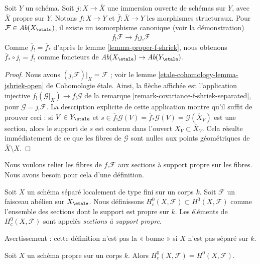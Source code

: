 \begin{lemma}
\label{lemma-compactify-f-shriek-separated}
Soit $Y$ un schéma. Soit $j : X \to \overline{X}$ une immersion
ouverte de schémas sur $Y$, avec $\overline{X}$ propre sur $Y$.
Notons $f : X \to Y$ et $\overline{f} : \overline{X} \to Y$
les morphismes structuraux. Pour $\mathcal{F} \in \textit{Ab}(X_\etale)$,
il existe un isomorphisme canonique (voir la démonstration)
$$
f_!\mathcal{F} \longrightarrow \overline{f}_!j_!\mathcal{F}
$$
Comme $\overline{f}_! = \overline{f}_*$ d'après le
lemme \ref{lemma-proper-f-shriek}, nous obtenons
$\overline{f}_* \circ j_! = f_!$ comme foncteurs de
$\textit{Ab}(X_\etale) \to \textit{Ab}(Y_\etale)$.
\end{lemma}

\begin{proof}
Nous avons $(j_!\mathcal{F})|_X = \mathcal{F}$ ; voir le
lemme \ref{etale-cohomology-lemma-jshriek-open} de Cohomologie étale.
Ainsi, la flèche affichée est l'application injective
$f_!(\mathcal{G}|_X) \to \overline{f}_!\mathcal{G}$
de la remarque \ref{remark-covariance-f-shriek-separated},
pour $\mathcal{G} = j_!\mathcal{F}$. La description explicite
de cette application montre qu'il suffit de prouver ceci : si $V \in Y_\etale$ et
$s \in \overline{f}_!\mathcal{G}(V) = \overline{f}_*\mathcal{G}(V) =
\mathcal{G}(\overline{X}_V)$
est une section, alors le support de $s$ est contenu dans l'ouvert
$X_V \subset \overline{X}_V$. Cela résulte immédiatement de ce que
les fibres de $\mathcal{G}$ sont nulles aux points géométriques
de $\overline{X} \setminus X$.
\end{proof}

\noindent
Nous voulons relier les fibres de $f_!\mathcal{F}$ aux sections à
support propre sur les fibres. Nous avons besoin pour cela d'une définition.

\begin{definition}
\label{definition-compact-support}
Soit $X$ un schéma séparé localement de type fini sur un corps $k$.
Soit $\mathcal{F}$ un faisceau abélien sur $X_\etale$. Nous définissons
$H^0_c(X, \mathcal{F}) \subset H^0(X, \mathcal{F})$ comme l'ensemble
des sections dont le support est propre sur $k$. Les éléments de
$H^0_c(X, \mathcal{F})$ sont appelés {\it sections à support propre}.
\end{definition}

\noindent
Avertissement : cette définition n'est pas la « bonne » si $X$ n'est pas
séparé sur $k$.

\begin{lemma}
\label{lemma-proper-compact-support}
Soit $X$ un schéma propre sur un corps $k$. Alors
$H^0_c(X, \mathcal{F}) = H^0(X, \mathcal{F})$.
\end{lemma}


